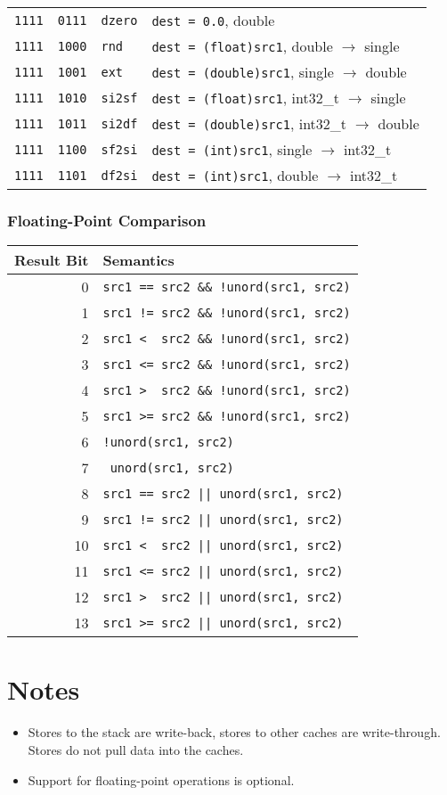 \documentclass[10pt,DIV12]{scrartcl}
\begin{document}
\begin{tabular}{ccll}
\texttt{1111} & \texttt{0111} & \texttt{dzero} & \texttt{dest = 0.0}, double \\
\texttt{1111} & \texttt{1000} & \texttt{rnd} & \texttt{dest = (float)src1}, double $\rightarrow$ single \\
\texttt{1111} & \texttt{1001} & \texttt{ext} & \texttt{dest = (double)src1}, single $\rightarrow$ double \\
\texttt{1111} & \texttt{1010} & \texttt{si2sf} & \texttt{dest = (float)src1}, int32\_t $\rightarrow$ single \\
\texttt{1111} & \texttt{1011} & \texttt{si2df} & \texttt{dest = (double)src1}, int32\_t $\rightarrow$ double \\
\texttt{1111} & \texttt{1100} & \texttt{sf2si} & \texttt{dest = (int)src1}, single $\rightarrow$ int32\_t \\
\texttt{1111} & \texttt{1101} & \texttt{df2si} & \texttt{dest = (int)src1}, double $\rightarrow$ int32\_t \\
\bottomrule
\end{tabular}

\subsubsection{Floating-Point Comparison}
\label{sec:fcmp}

\begin{tabular}{rl}
\toprule
Result Bit & Semantics \\
\midrule
0 & \texttt{src1 == src2 \&\& !unord(src1, src2)} \\
1 & \texttt{src1 != src2 \&\& !unord(src1, src2)} \\
2 & \texttt{src1 <\ \ src2 \&\& !unord(src1, src2)} \\
3 & \texttt{src1 <= src2 \&\& !unord(src1, src2)} \\
4 & \texttt{src1 >\ \ src2 \&\& !unord(src1, src2)} \\
5 & \texttt{src1 >= src2 \&\& !unord(src1, src2)} \\
6 & \texttt{!unord(src1, src2)} \\
7 & \texttt{\ unord(src1, src2)} \\
8 & \texttt{src1 == src2 || unord(src1, src2)} \\
9 & \texttt{src1 != src2 || unord(src1, src2)} \\
10 & \texttt{src1 <\ \  src2 || unord(src1, src2)} \\
11 & \texttt{src1 <= src2 || unord(src1, src2)} \\
12 & \texttt{src1 >\ \  src2 || unord(src1, src2)} \\
13 & \texttt{src1 >= src2 || unord(src1, src2)} \\
\bottomrule
\end{tabular}

\section{Notes}

\begin{itemize}
\item Stores to the stack are write-back, stores to other caches are
  write-through. Stores do not pull data into the caches.
\item Support for floating-point operations is optional.
\end{itemize}
\end{document}
